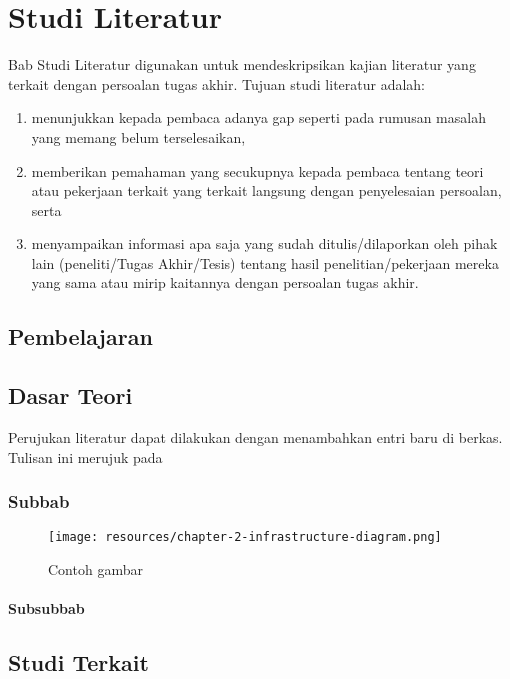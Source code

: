 \chapter{Studi Literatur}

Bab Studi Literatur digunakan untuk mendeskripsikan kajian literatur yang terkait dengan persoalan tugas akhir. Tujuan studi literatur adalah:

\begin{enumerate}
    \item menunjukkan kepada pembaca adanya gap seperti pada rumusan masalah yang memang belum terselesaikan,
    \item memberikan pemahaman yang secukupnya kepada pembaca tentang teori atau pekerjaan terkait yang terkait langsung dengan penyelesaian persoalan, serta
    \item menyampaikan informasi apa saja yang sudah ditulis/dilaporkan oleh pihak lain (peneliti/Tugas Akhir/Tesis) tentang hasil penelitian/pekerjaan mereka yang sama atau mirip kaitannya dengan persoalan tugas akhir.
\end{enumerate}

\section{Pembelajaran}

\blindtext

\section{Dasar Teori}
Perujukan literatur dapat dilakukan dengan menambahkan entri baru di berkas. Tulisan ini merujuk pada \parencite{knuth2001art}

\subsection{Subbab}

\blindtext

\begin{figure}[h]
    \centering
    \texttt{[image: resources/chapter-2-infrastructure-diagram.png]}
    \caption{Contoh gambar}
\end{figure}

\subsubsection{Subsubbab}

\blindtext

\section{Studi Terkait}
\blindtext
